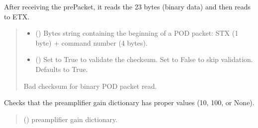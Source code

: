\documentclass[letterpaper,10pt,english]{sphinxmanual}
\begin{document}
\begin{fulllineitems}
\begin{fulllineitems}
\label{\detokenize{PodApi.Devices:PodApi.Devices.PodDevice_8401HR.Pod8401HR._Read_Binary}}
\pysigstartsignatures
{}
\pysigstopsignatures
\sphinxAtStartPar
After receiving the prePacket, it reads the 23 bytes (binary data) and then reads to ETX.
\begin{quote}\begin{description}
\begin{itemize}
\item {} 
\sphinxAtStartPar
{} () \textendash{} Bytes string containing the beginning of a POD packet: STX (1 byte)                 + command number (4 bytes).

\item {} 
\sphinxAtStartPar
{} (\sphinxstyleliteralemphasis{\sphinxupquote{, }}) \textendash{} Set to True to validate the checksum. Set to False to                 skip validation. Defaults to True.

\end{itemize}

\sphinxAtStartPar
{} \textendash{} Bad checksum for binary POD packet read.

\end{description}\end{quote}

\end{fulllineitems}


\begin{fulllineitems}
\label{\detokenize{PodApi.Devices:PodApi.Devices.PodDevice_8401HR.Pod8401HR._ValidatePreampGain}}
\pysigstartsignatures
{}
\pysigstopsignatures
\sphinxAtStartPar
Checks that the preamplifier gain dictionary has proper values (10, 100, or None).
\begin{quote}\begin{description}
\sphinxAtStartPar
{} () \textendash{} preamplifier gain dictionary.


\end{description}
\end{quote}
\end{fulllineitems}
\end{fulllineitems}
\end{document}
